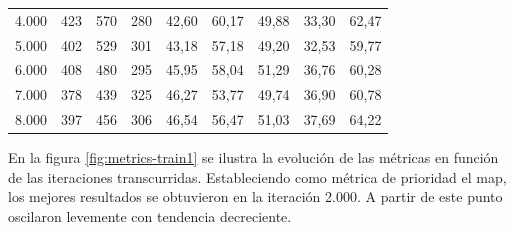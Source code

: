 \begin{table}[ht]
\begin{tabular}{lcccccccc}
4.000               & 423          & 570          & 280          & 42,60                                                             & 60,17                                                          & 49,88                                                           & 33,30                                                               & 62,47                                                             \\
5.000               & 402          & 529          & 301          & 43,18                                                             & 57,18                                                          & 49,20                                                           & 32,53                                                               & 59,77                                                             \\
6.000               & 408          & 480          & 295          & 45,95                                                             & 58,04                                                          & 51,29                                                           & 36,76                                                               & 60,28                                                             \\
7.000               & 378          & 439          & 325          & 46,27                                                             & 53,77                                                          & 49,74                                                           & 36,90                                                               & 60,78                                                             \\
8.000               & 397          & 456          & 306          & 46,54                                                             & 56,47                                                          & 51,03                                                           & 37,69                                                               & 64,22                                                             \\ \hline
\end{tabular}
\end{table}

En la figura \ref{fig:metrics-train1} se ilustra la evolución de las métricas en función de las iteraciones transcurridas. Estableciendo como métrica de prioridad el \gls{map}, los mejores resultados se obtuvieron en la iteración 2.000. A partir de este punto oscilaron levemente con tendencia decreciente.

